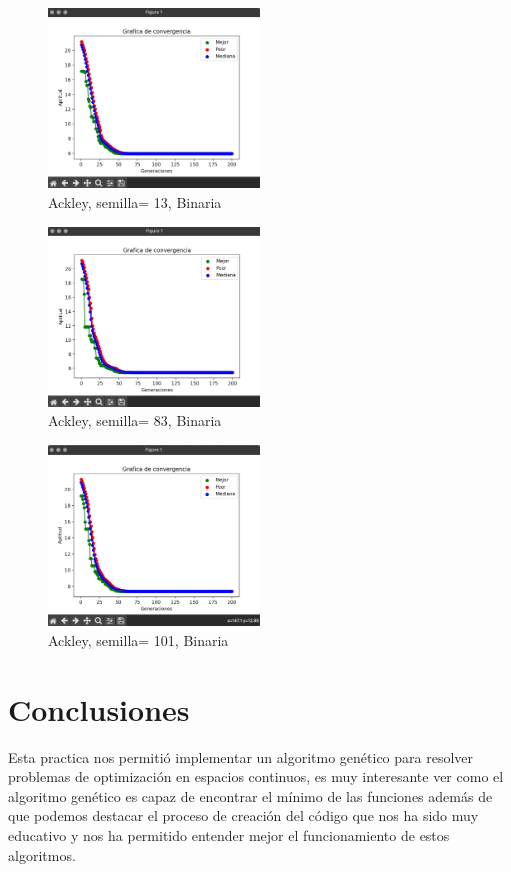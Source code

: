 \documentclass{report}
\begin{document}
    \begin{figure}[htbp]
        \centering
        \includegraphics[width=0.5\textwidth]{ackley_13_bin.jpeg}
        \caption{Ackley, semilla= 13, Binaria}
    \end{figure}
    \begin{figure}[htbp]
        \centering
        \includegraphics[width=0.5\textwidth]{ackley_83_bin.jpeg}
        \caption{Ackley, semilla= 83, Binaria}
    \end{figure}
    \begin{figure}[htbp]
        \centering
        \includegraphics[width=0.5\textwidth]{ackley_101_bin.jpeg}
        \caption{Ackley, semilla= 101, Binaria}
    \end{figure}

    \newpage
    \section*{Conclusiones}
    Esta practica nos permitió implementar un algoritmo genético para resolver problemas de optimización en espacios continuos, es muy
    interesante ver como el algoritmo genético es capaz de encontrar el mínimo de las funciones además de que
    podemos destacar el proceso de creación del código que nos ha sido muy educativo y nos ha permitido entender mejor el funcionamiento de estos algoritmos.
\end{document}
